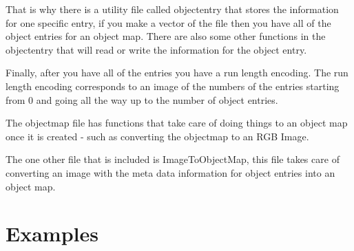 \documentclass{InsightArticle}
\begin{document}
That is why there is a utility file called objectentry that stores the
information for one specific entry, if you make a vector of the file then you have all of the object entries for an object map.  There
are also some other functions in the objectentry that will read or write the information for the object entry.  

Finally, after you have all of the entries you have a run length encoding.  The run length encoding corresponds to an image of the numbers of the entries starting from 0 and going all the way up to the number of object entries.  

The objectmap file has functions that take care of doing things to an object map once it is created - such as converting the objectmap to an RGB Image. 

The one other file that is included is ImageToObjectMap, this file takes care of converting an image with the meta data information for object entries into an object map.

\section{Examples}
\end{document}
